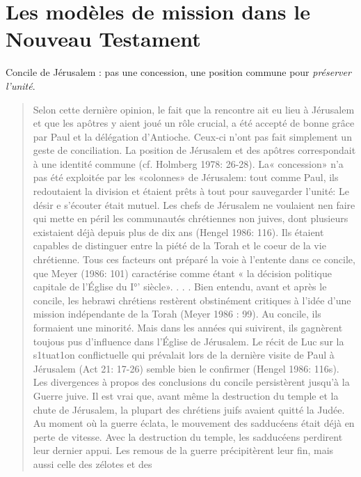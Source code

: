 \chapter{Les modèles de mission dans le Nouveau Testament}


\begin{Synthesis}
Concile de Jérusalem : pas une concession, une position commune pour \textit{préserver l'unité}.
\end{Synthesis}

\begin{quote}
 Selon cette dernière opinion, le fait que la rencontre ait
eu lieu à Jérusalem et que les apôtres y aient joué un rôle crucial, a été
accepté de bonne grâce par Paul et la délégation d'Antioche. Ceux-ci
n'ont pas fait simplement un geste de conciliation. La position de
Jérusalem et des apôtres correspondait à une identité commune (cf.
Holmberg 1978: 26-28). La« concession» n'a pas été exploitée par
les «colonnes» de Jérusalem: tout comme Paul, ils redoutaient la
division et étaient prêts à tout pour sauvegarder l'unité: Le désir e
s'écouter était mutuel. Les chefs de Jérusalem ne voulaient nen faire
qui mette en péril les communautés chrétiennes non juives, dont
plusieurs existaient déjà depuis plus de dix ans (Hengel 1986: 116).
Ils étaient capables de distinguer entre la piété de la Torah et le coeur
de la vie chrétienne. Tous ces facteurs ont préparé la voie à l'entente
dans ce concile, que Meyer (1986: 101) caractérise comme étant « la
décision politique capitale de l'Église du I°'  siècle». . . .
Bien entendu, avant et après le concile, les hebrawi chrétiens
restèrent obstinément critiques à l'idée d'une mission indépendante de
la Torah (Meyer 1986 : 99). Au concile, ils formaient une minorité.
Mais dans les années qui suivirent, ils gagnèrent toujous pus
d'influence dans l'Église de Jérusalem. Le récit de Luc sur la s1tuat1on
conflictuelle qui prévalait lors de la dernière visite de Paul à Jérusalem
(Act 21: 17-26) semble bien le confirmer (Hengel 1986: 116s).
Les divergences à propos des conclusions du concile persistèrent
jusqu'à la Guerre juive. Il est vrai que, avant même la destruction du
temple et la chute de Jérusalem, la plupart des chrétiens juifs avaient
quitté la Judée. Au moment où la guerre éclata, le mouvement des
sadducéens était déjà en perte de vitesse. Avec la destruction du
temple, les sadducéens perdirent leur dernier appui. Les remous de la
guerre précipitèrent leur fin, mais aussi celle des zélotes et des

\end{quote}
